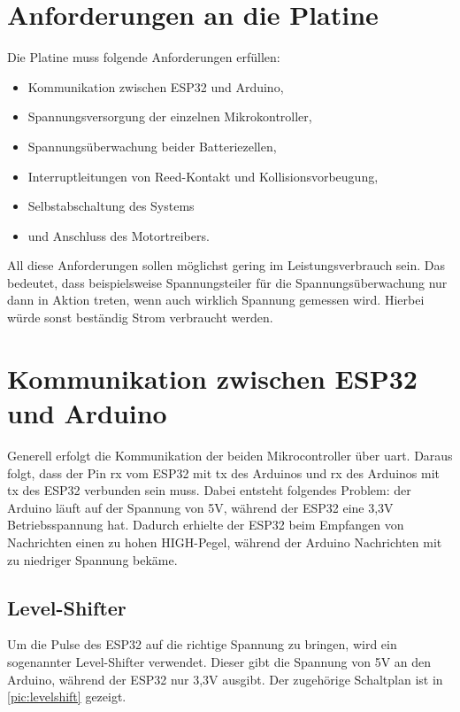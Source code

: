 \section{Anforderungen an die Platine}
Die Platine muss folgende Anforderungen erfüllen: 
\begin{center}
	\begin{itemize}
		\item Kommunikation zwischen ESP32 und Arduino,
		\item Spannungsversorgung der einzelnen Mikrokontroller,
		\item Spannungsüberwachung beider Batteriezellen,
		\item Interruptleitungen von Reed-Kontakt und Kollisionsvorbeugung,
		\item Selbstabschaltung des Systems
		\item und Anschluss des Motortreibers.
	\end{itemize}
\end{center}
All diese Anforderungen sollen möglichst gering im Leistungsverbrauch sein. Das bedeutet, dass beispielsweise Spannungsteiler für die Spannungsüberwachung nur dann in Aktion treten, wenn auch wirklich Spannung gemessen wird. Hierbei würde sonst beständig Strom verbraucht werden.

\section{Kommunikation zwischen ESP32 und Arduino}
Generell erfolgt die Kommunikation der beiden Mikrocontroller über \acrshort{uart}. Daraus folgt, dass der Pin \acrfull{rx} vom ESP32 mit \acrfull{tx} des Arduinos und \acrshort{rx} des Arduinos mit \acrshort{tx} des ESP32 verbunden sein muss. 
Dabei entsteht folgendes Problem: der Arduino läuft auf der Spannung von 5V, während der ESP32 eine 3,3V Betriebsspannung hat. Dadurch erhielte der ESP32 beim Empfangen von Nachrichten einen zu hohen HIGH-Pegel, während der Arduino Nachrichten mit zu niedriger Spannung bekäme.

\subsection{Level-Shifter}
Um die Pulse des ESP32 auf die richtige Spannung zu bringen, wird ein sogenannter Level-Shifter verwendet. Dieser gibt die Spannung von 5V an den Arduino, während der ESP32 nur 3,3V ausgibt.
Der zugehörige Schaltplan ist in \autoref{pic:levelshift} gezeigt.
\vspace{1cm}

